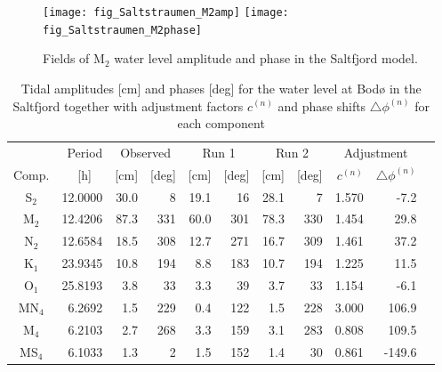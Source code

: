 \begin{figure}[!t]
\centering
\texttt{[image: fig\_Saltstraumen\_M2amp]}
\texttt{[image: fig\_Saltstraumen\_M2phase]}
\caption{Fields of M$_2$ water level amplitude and phase in the Saltfjord model.}
\label{fig:Saltstraumen_field}
\end{figure}

\begin{table}[ht]
\caption{Tidal amplitudes [cm] and phases [deg] for the water level at Bod{\o} in the Saltfjord together with adjustment factors $c^{(n)}$ and phase shifts $\triangle \phi^{(n)}$ for each component}
\label{tab:Bodo}
\centering
\begin{tabular}{crrrrrrrrrr} \hline
      & Period & \multicolumn{2}{c}{Observed} & \multicolumn{2}{c}{Run 1} & \multicolumn{2}{c}{Run 2} & \multicolumn{2}{c}{Adjustment} \\
Comp. & [h] $\;\;$ & [cm] & [deg] & [cm] & [deg] & [cm] & [deg] & $c^{(n)}$ & $\triangle \phi^{(n)}$  \\ \hline 
S$_2$   & 12.0000  &  30.0 &      8   &  19.1 &     16   &  28.1 &      7    &   1.570  &    -7.2   \\ 
M$_2$   & 12.4206  &  87.3 &    331   &  60.0 &    301   &  78.3 &    330    &   1.454  &    29.8   \\ 
N$_2$   & 12.6584  &  18.5 &    308   &  12.7 &    271   &  16.7 &    309    &   1.461  &    37.2   \\ 
K$_1$   & 23.9345  &  10.8 &    194   &   8.8 &    183   &  10.7 &    194    &   1.225  &    11.5   \\ 
O$_1$   & 25.8193  &   3.8 &     33   &   3.3 &     39   &   3.7 &     33    &   1.154  &    -6.1   \\ 
MN$_4$  &  6.2692  &   1.5 &    229   &   0.4 &    122   &   1.5 &    228    &   3.000  &   106.9   \\ 
M$_4$   &  6.2103  &   2.7 &    268   &   3.3 &    159   &   3.1 &    283    &   0.808  &   109.5   \\ 
MS$_4$  &  6.1033  &   1.3 &      2   &   1.5 &    152   &   1.4 &     30    &   0.861  &  -149.6   \\ \hline
\end{tabular}
\end{table}

